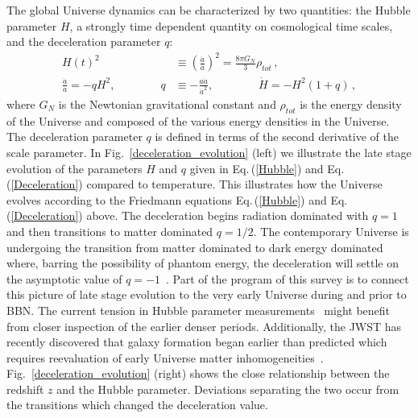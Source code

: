 \documentclass[universe,article,submit,moreauthors,pdftex,a4paper]{Definitions/mdpi}
\newcommand{\req}[1]{Eq.\,(\ref{#1})}
\newcommand*{\rf}[1]{Fig.~{\ref{#1}}}
\begin{document}
The global Universe dynamics can be characterized by two quantities: the Hubble parameter $H$, a strongly time dependent quantity on cosmological time scales, and the deceleration parameter $q$:
\begin{align}
 \label{Hubble} H(t)^{2}&\equiv\left(\frac{\dot a}{a}\right)^2=\frac{8\pi G_{N}}{3}\rho_{tot}\,,\\
 \label{Deceleration} \frac{\ddot a}{a}=-qH^2,\qquad\qquad q&\equiv -\frac{a\ddot a}{\dot a^2},\qquad\qquad \dot H=-H^2(1+q)\,, 
\end{align}
where $G_{N}$ is the Newtonian gravitational constant and $\rho_{tot}$ is the energy density of the Universe and composed of the various energy densities in the Universe. The deceleration parameter $q$ is defined in terms of the second derivative of the scale parameter. In \rf{deceleration_evolution} (left) we illustrate the late stage evolution of the parameters $H$ and $q$ given in \req{Hubble} and \req{Deceleration} compared to temperature. This illustrates how the Universe evolves according to the Friedmann equations \req{Hubble} and \req{Deceleration} above. The deceleration begins radiation dominated with $q=1$ and then transitions to matter dominated $q=1/2$. The contemporary Universe is undergoing the transition from matter dominated to dark energy dominated where, barring the possibility of phantom energy, the deceleration will settle on the asymptotic value of $q=-1$~\cite{Rafelski:2013yka}. Part of the program of this survey is to connect this picture of late stage evolution to the very early Universe during and prior to BBN. The current tension in Hubble parameter measurements~\cite{Perivolaropoulos:2021jda,DiValentino:2021izs,Aluri:2022hzs}
might benefit from closer inspection of the earlier denser periods. Additionally, the JWST has recently discovered that galaxy formation began earlier than predicted which requires reevaluation of early Universe matter inhomogeneities~\cite{Yan:2022sxd}. \rf{deceleration_evolution} (right) shows the close relationship between the redshift $z$ and the Hubble parameter. Deviations separating the two occur from the transitions which changed the deceleration value.
\end{document}
